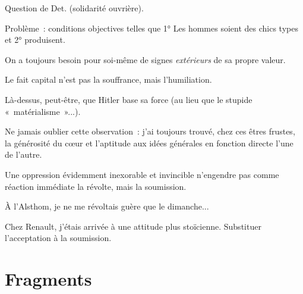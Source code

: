 \documentclass[french,twoside]{book} %
\begin{document}
Question de Det. (solidarité ouvrière).\par
Problème : conditions objectives telles que 1° Les hommes soient des chics types et 2° produisent.\par
On a toujours besoin pour soi-même de signes {\itshape extérieurs} de sa propre valeur.\par
Le fait capital n'est pas la souffrance, mais l'humiliation.\par
Là-dessus, peut-être, que Hitler base sa force (au lieu que le stupide « matérialisme »...).\par
[Si le syndicalisme donnait un sentiment de responsabilité dans la vie quotidienne...]\par
Ne jamais oublier cette observation : j'ai toujours trouvé, chez ces êtres frustes, la générosité du cœur et l'aptitude aux idées générales en fonction directe l'une de l'autre.\par
Une oppression évidemment inexorable et invincible n'engendre pas comme réaction immédiate la révolte, mais la soumission.\par
À l'Alsthom, je ne me révoltais guère que le dimanche...\par
Chez Renault, j'étais arrivée à une attitude plus stoïcienne. Substituer l'acceptation à la soumission.
\section[Fragments ]{Fragments \protect\footnotemark }\renewcommand{\leftmark}{Fragments }
\end{document}
